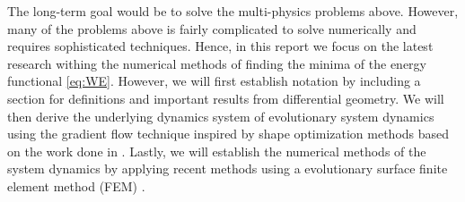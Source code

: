 The long-term goal would be to solve the multi-physics problems above. However, many of the problems above is fairly complicated to solve numerically and requires sophisticated techniques. Hence, in this report we focus on the latest research withing
the numerical methods of finding the minima of the energy functional \eqref{eq:WE}. However, we will first establish notation by including a section for definitions and important results from differential geometry. We will then derive the
underlying dynamics system of evolutionary system dynamics using the gradient flow technique inspired by shape optimization methods based on the work done in \cite{ dougan2012first}. Lastly, we will establish the numerical methods of the system
dynamics by applying recent methods using a evolutionary surface finite element method (FEM) \cite{kovacs2021convergent, hu2022evolving}.


